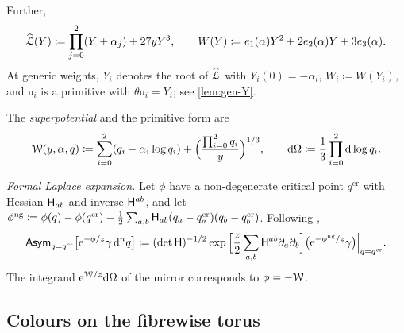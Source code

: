 Further,
\begin{equation}
\label{eq:set-LW}
\widehat{\mathcal{L}}(Y)\coloneqq\prod_{j=0}^{2}(Y+\alpha_j)+27yY^3,\qquad W(Y)\coloneqq e_1(\alpha)Y^2+2e_2(\alpha)Y+3e_3(\alpha).
\end{equation}
At generic weights, $Y_i$ denotes the root of $\widehat{\mathcal{L}}$ with $Y_i(0)=-\alpha_i$, $W_i\coloneqq W(Y_i)$, and $\mathsf{u}_i$ is a primitive with $\theta\mathsf{u}_i=Y_i$; see \cref{lem:gen-Y}. 

The \emph{superpotential} and the primitive form are
\begin{equation}
\label{eq:set-spot}
\mathcal{W}(y,\alpha,q)\coloneqq\sum_{i=0}^{2}(q_i-\alpha_i\log q_i)+\Big(\frac{\prod_{i=0}^2q_i}{y}\Big)^{1/3},\qquad
\mathrm{d}\Omega\coloneqq\frac13\prod_{i=0}^{2}\mathrm{d}\log q_i.
\end{equation}

\emph{Formal Laplace expansion.} Let $\phi$ have a non-degenerate critical point $q^{\mathrm{cr}}$ with Hessian $\mathsf{H}_{ab}$ and inverse $\mathsf{H}^{ab}$, and let $\phi^{\mathrm{ng}}\coloneqq\phi(q)-\phi(q^{\mathrm{cr}})-\frac12\sum_{a,b}\mathsf{H}_{ab}(q_a-q_a^{\mathrm{cr}})(q_b-q_b^{\mathrm{cr}})$. Following \cite{BS},
\begin{equation}
\label{eq:set-asym}
\mathsf{Asym}_{q=q^{\mathrm{cr}}}\big[\mathrm{e}^{-\phi/z}\gamma\,\mathrm{d}^nq\big]\coloneqq(\det\mathsf{H})^{-1/2}\exp\Big[\frac z2\sum_{a,b}\mathsf{H}^{ab}\partial_a\partial_b\Big]\big(\mathrm{e}^{-\phi^{\mathrm{ng}}/z}\gamma\big)\Big|_{q=q^{\mathrm{cr}}}.
\end{equation}
The integrand $\mathrm{e}^{\mathcal{W}/z}\mathrm{d}\Omega$ of the mirror corresponds to $\phi=-\mathcal{W}$. 

\subsection{Colours on the fibrewise torus}
\label{sec:set-colours}

